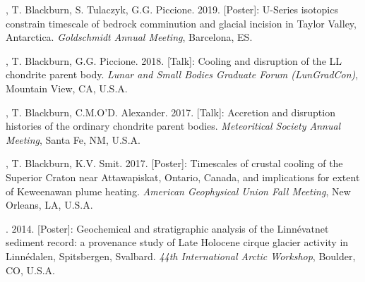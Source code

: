 \begin{etaremune} [itemsep=4pt, leftmargin=3ex]
  \item  \ghedwards, T. Blackburn, S. Tulaczyk, G.G. Piccione. 2019. [Poster]: U-Series isotopics constrain timescale of bedrock comminution and glacial incision in Taylor Valley, Antarctica. \textit{Goldschmidt Annual Meeting}, Barcelona, ES.
  
	\item  \ghedwards, T. Blackburn, G.G. Piccione. 2018. [Talk]: Cooling and disruption of the LL chondrite parent body. \textit{Lunar and Small Bodies Graduate Forum (LunGradCon)}, Mountain View, CA, U.S.A.
	
  \item  \ghedwards, T. Blackburn, C.M.O’D. Alexander. 2017. [Talk]: Accretion and disruption histories of the ordinary chondrite parent bodies. \textit{Meteoritical Society Annual Meeting}, Santa Fe, NM, U.S.A.
  
  \item \ghedwards, T. Blackburn, K.V. Smit. 2017. [Poster]: Timescales of crustal cooling of the Superior Craton near Attawapiskat, Ontario, Canada, and implications for extent of Keweenawan plume heating. \textit{American Geophysical Union Fall Meeting}, New Orleans, LA, U.S.A.
  
  \item \ghedwards. 2014. [Poster]: Geochemical and stratigraphic analysis of the Linnévatnet sediment record: a provenance study of Late Holocene cirque glacier activity in Linnédalen, Spitsbergen, Svalbard. \textit{44th International Arctic Workshop}, Boulder, CO, U.S.A.
\end{etaremune}